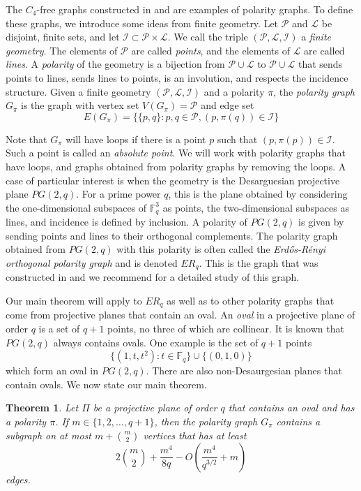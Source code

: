 \documentclass[12pt]{article}
\newtheorem{theorem}{Theorem}[section]
\begin{document}
The $C_4$-free graphs constructed in \cite{b} and \cite{ers} are examples of polarity graphs.  To define these graphs, we introduce some ideas from finite geometry.  Let $\mathcal{P}$ and $\mathcal{L}$ be disjoint, finite sets, and let $\mathcal{I}\subset \mathcal{P}\times \mathcal{L}$. We call the triple $(\mathcal{P}, \mathcal{L}, \mathcal{I})$ a {\em finite geometry}.  The elements of $\mathcal{P}$ are called {\em points}, and the elements of $\mathcal{L}$ are called {\em lines}.   A {\em polarity} of the geometry is a bijection from $\mathcal{P}\cup \mathcal{L}$ to $\mathcal{P}\cup \mathcal{L}$ that sends points to lines, sends lines to points, is an involution, and respects the incidence structure.  Given a finite geometry $(\mathcal{P}, \mathcal{L}, \mathcal{I})$ and a polarity $\pi$, the {\em polarity graph} $G_\pi$ is the graph with vertex set $V(G_\pi) = \mathcal{P}$ and edge set
$$ E(G_\pi) = \{\{p,q\}: p,q\in \mathcal{P}, (p, \pi(q))\in \mathcal{I}\} $$

Note that $G_\pi$ will have loops if there is a point $p$ such that $(p, \pi(p))\in \mathcal{I}$.
Such a point is called an {\em absolute point}. We will work with polarity graphs that have loops, and graphs obtained from polarity graphs by removing the loops.  A case of particular interest is when the geometry is
the Desarguesian projective plane $PG(2,q)$.   For a prime power $q$, this is the plane obtained by considering the one-dimensional subspaces of $\mathbb{F}_q^3$ as points, the two-dimensional subspaces as lines, and incidence is defined by inclusion. A polarity of $PG(2,q)$ is given by sending points and lines to their orthogonal complements. The polarity graph obtained from $PG(2,q)$ with this polarity is often called the {\em Erd\H{o}s-R\'{e}nyi orthogonal polarity graph} and is denoted $ER_q$.  This is the graph that was constructed in \cite{b, ers} and we recommend \cite{bs} for a detailed study of this graph.

Our main theorem will apply to $ER_q$ as well as to other polarity graphs that come from projective planes that contain an oval.
An \emph{oval} in a projective plane of order $q$ is a set of $q+1$ points, no three of which are collinear.  It is known that $PG(2,q)$ always contains ovals.  One example is the set of $q+1$ points
$$ \{(1 , t , t^2 ) : t \in \mathbb{F}_q \} \cup \{ (0,1,0) \} $$
which form an oval in $PG(2,q)$.  There are also non-Desaurgesian planes that contain ovals.  We now state our main theorem.

\begin{theorem}\label{dense subgraph}
    Let $\Pi$ be a projective plane of order $q$ that contains an oval and has a polarity $\pi$.  If $m \in \{1,2, \dots , q + 1 \}$, then the polarity graph $G_{ \pi}$ contains a subgraph on at most $m + \binom{m}{2}$ vertices that has at least
    $$ 2 \binom{m}{2} + \frac{m^4}{8q} - O \left( \frac{m^4}{q^{3/2} } + m \right) $$
    edges.
\end{theorem}
\end{document}
